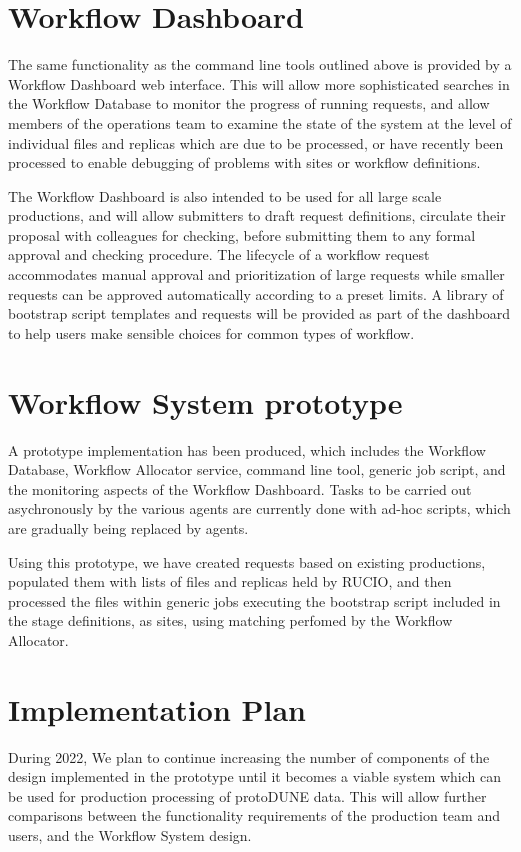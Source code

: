 \documentclass[../main-v1.tex]{subfiles}
\begin{document}
\section{Workflow Dashboard}
\label{sec:flow:dashboard}

The same functionality as the command line tools outlined above is provided by a Workflow Dashboard web interface. This will allow more sophisticated searches in the Workflow Database to monitor the progress of running requests, and allow members of the operations team to examine the state of the system at the level of individual files and replicas which are due to be processed, or have recently been processed to enable debugging of problems with sites or workflow definitions.

The Workflow Dashboard is also intended to be used for all large scale productions, and will allow submitters to draft request definitions, circulate their proposal with colleagues for checking, before submitting them to any formal approval and checking procedure. The lifecycle of a workflow request accommodates manual approval and prioritization of large requests while smaller requests can be approved automatically according to a preset limits. A library of bootstrap script templates and requests will be provided as part of the dashboard to help users make sensible choices for common types of workflow.

\section{Workflow System prototype}
\label{sec:flow:prototype}

A prototype implementation has been produced, which includes the Workflow Database, Workflow Allocator service, command line tool, generic job script, and the monitoring aspects of the Workflow Dashboard. Tasks to be carried out asychronously by the various agents are currently done with ad-hoc scripts, which are gradually being replaced by agents.

Using this prototype, we have created requests based on existing productions, populated them with lists of files and replicas held by RUCIO, and then processed the files within generic jobs executing the bootstrap script included in the stage definitions, as sites, using matching perfomed by the Workflow Allocator.

\section{Implementation Plan }
\label{sec:flow:implementation}

During 2022, We plan to continue increasing the number of components of the design implemented in the prototype until it becomes a viable system which can be used for production processing of protoDUNE data. This will allow further comparisons between the functionality requirements of the production team and users, and the Workflow System design.

\end{document}
